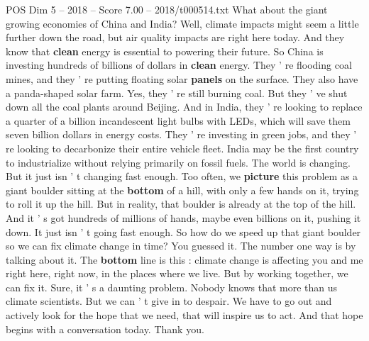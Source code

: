 \begin{textsample}{POS Dim 5 – 2018 – Score 7.00 – 2018/t000514.txt}
What about the giant growing economies of China and India?
Well, climate impacts might seem a little further down the road, but air quality impacts are right here today.
And they know that \textbf{clean} energy is essential to powering their future.
So China is investing hundreds of billions of dollars in \textbf{clean} energy.
They ' re flooding coal mines, and they ' re putting floating solar \textbf{panels} on the surface.
They also have a panda-shaped solar farm.
Yes, they ' re still burning coal.
But they ' ve shut down all the coal plants around Beijing.
And in India, they ' re looking to replace a quarter of a billion incandescent light bulbs with LEDs, which will save them seven billion dollars in energy costs.
They ' re investing in green jobs, and they ' re looking to decarbonize their entire vehicle fleet.
India may be the first country to industrialize without relying primarily on fossil fuels.
The world is changing.
But it just isn ' t changing fast enough.
Too often, we \textbf{picture} this problem as a giant boulder sitting at the \textbf{bottom} of a hill, with only a few hands on it, trying to roll it up the hill.
But in reality, that boulder is already at the top of the hill.
And it ' s got hundreds of millions of hands, maybe even billions on it, pushing it down.
It just isn ' t going fast enough.
So how do we speed up that giant boulder so we can fix climate change in time?
You guessed it.
The number one way is by talking about it.
The \textbf{bottom} line is this : climate change is affecting you and me right here, right now, in the places where we live.
But by working together, we can fix it.
Sure, it ' s a daunting problem.
Nobody knows that more than us climate scientists.
But we can ' t give in to despair.
We have to go out and actively look for the hope that we need, that will inspire us to act.
And that hope begins with a conversation today.
Thank you.

\end{textsample}
